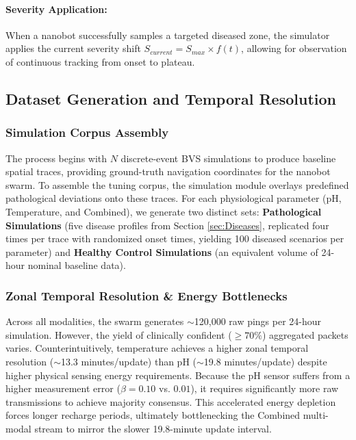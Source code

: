 \documentclass[sigconf]{acmart}
\begin{document}
\paragraph{Severity Application:} When a nanobot successfully samples a targeted diseased zone, the simulator applies the current severity shift $S_{current} = S_{max} \times f(t)$, allowing for observation of continuous tracking from onset to plateau.

\subsection{Dataset Generation and Temporal Resolution}

\subsubsection{Simulation Corpus Assembly}
The process begins with $N$ discrete-event BVS simulations to produce baseline spatial traces, providing ground-truth navigation coordinates for the nanobot swarm. To assemble the tuning corpus, the simulation module overlays predefined pathological deviations onto these traces. For each physiological parameter (pH, Temperature, and Combined), we generate two distinct sets: \textbf{Pathological Simulations} (five disease profiles from Section \ref{sec:Diseases}, replicated four times per trace with randomized onset times, yielding 100 diseased scenarios per parameter) and \textbf{Healthy Control Simulations} (an equivalent volume of 24-hour nominal baseline data).

\subsubsection{Zonal Temporal Resolution \& Energy Bottlenecks} 
Across all modalities, the swarm generates $\sim$120,000 raw pings per 24-hour simulation. However, the yield of clinically confident ($\ge 70\%$) aggregated packets varies. Counterintuitively, temperature achieves a higher zonal temporal resolution ($\sim$13.3 minutes/update) than pH ($\sim$19.8 minutes/update) despite higher physical sensing energy requirements. Because the pH sensor suffers from a higher measurement error ($\beta = 0.10$ vs. $0.01$), it requires significantly more raw transmissions to achieve majority consensus. This accelerated energy depletion forces longer recharge periods, ultimately bottlenecking the Combined multi-modal stream to mirror the slower 19.8-minute update interval.
\end{document}
